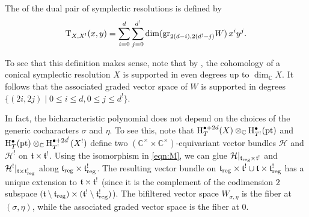 \begin{definition}[def:]{}
    The  of the dual pair of symplectic resolutions is defined by
    \begin{equation*}
        \mathrm{T}_{X, X^!}(x, y) = \sum_{i=0}^d \sum_{j=0}^{d^!} \dim (\mathrm{gr}_{2(d-i), 2(d^!-j)} W) \, x^i y^j.
    \end{equation*}
\end{definition}

To see that this definition makes sense, note that by \cite{kaledin2006symplecticsingularitiespoissonpoint}, the cohomology of a conical symplectic resolution $X$ is supported in even degrees up to $\dim_\mathbb{C} X$. It follows that the associated graded vector space of $W$ is supported in degrees $\{ (2i, 2j) \mid 0 \leq i \leq d, 0 \leq j \leq d^! \}$.

In fact, the bicharacteristic polynomial does not depend on the choices of the generic cocharacters $\sigma$ and $\eta$. To see this, note that $\mathrm{H}^{\bullet+2d}_T(X) \otimes_\mathbb{C} \mathrm{H}^\bullet_{T^!}(\mathrm{pt})$ and $\mathrm{H}^\bullet_T(\mathrm{pt}) \otimes_\mathbb{C} \mathrm{H}^{\bullet+2d^!}_{T^!}(X^!)$ define two $(\mathbb{C}^\times \times \mathbb{C}^\times)$-equivariant vector bundles $\mathcal{H}$ and $\mathcal{H}^!$ on $\mathfrak{t} \times \mathfrak{t}^!$. Using the isomorphism in \ref{eqn:M}, we can glue $\mathcal{H}|_{\mathfrak{t}_\mathrm{reg} \times \mathfrak{t}^!}$ and $\mathcal{H}^!|_{\mathfrak{t} \times \mathfrak{t}^!_\mathrm{reg}}$ along $\mathfrak{t}_\mathrm{reg} \times \mathfrak{t}^!_\mathrm{reg}$. The resulting vector bundle on $\mathfrak{t}_\mathrm{reg} \times \mathfrak{t}^! \cup \mathfrak{t} \times \mathfrak{t}^!_\mathrm{reg}$ has a unique extension to $\mathfrak{t} \times \mathfrak{t}^!$ (since it is the complement of the codimension $2$ subspace $(\mathfrak{t} \setminus \mathfrak{t}_\mathrm{reg}) \times (\mathfrak{t}^! \setminus \mathfrak{t}^!_\mathrm{reg})$). The bifiltered vector space $W_{\sigma, \eta}$ is the fiber at $(\sigma, \eta)$, while the associated graded vector space is the fiber at $0$.
